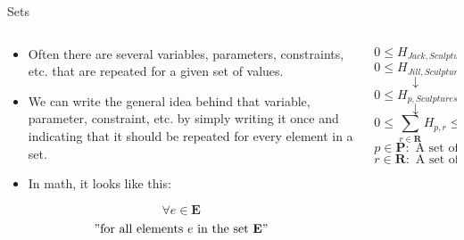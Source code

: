 \documentclass[10pt, aspectratio=169]{beamer}
\begin{document}
\begin{frame}{Sets}
    \begin{columns}
        \begin{column}{0.5\textwidth}
            \begin{itemize}
                \item Often there are several variables, parameters, constraints, etc. that are repeated for a given set of values.
                \item We can write the general idea behind that variable, parameter, constraint, etc. by simply writing it once and indicating that it should be repeated for every element in a set.
                \item In math, it looks like this:
            \end{itemize}
            $$\forall e \in \textbf{E}$$
            $$"\text{for all elements } e \text{ in the set } \textbf{E}"$$
        \end{column}
        \begin{column}{0.5\textwidth}
            $$0 \leq H_{Jack,Sculptures} + H_{Jack,Shirts} \leq \tau^{DAY}$$
            $$0 \leq H_{Jill,Sculptures} + H_{Jill,Shirts} \leq \tau^{DAY}$$
            $$\downarrow$$
            $$0 \leq H_{p,Sculptures} + H_{p,Shirts} \leq \tau^{DAY} \ \ \forall p \in \textbf{P}$$
            $$\downarrow$$
            $$0 \leq \sum_{r \in \textbf{R}} H_{p,r} \leq \tau^{DAY} \ \ \forall p \in \textbf{P}$$
            \vspace{0.5cm}
            $$p\in\textbf{P}:\text{ A set of all People}$$
            $$r\in\textbf{R}:\text{ A set of all Products}$$
        \end{column}
    \end{columns}
\end{frame}
\end{document}
